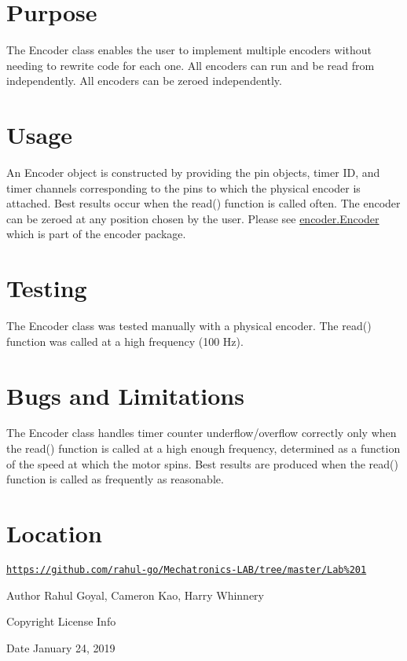 \hypertarget{index_purpose}{}\section{Purpose}\label{index_purpose}
The Encoder class enables the user to implement multiple encoders without needing to rewrite code for each one. All encoders can run and be read from independently. All encoders can be zeroed independently.\hypertarget{index_usage}{}\section{Usage}\label{index_usage}
An Encoder object is constructed by providing the pin objects, timer ID, and timer channels corresponding to the pins to which the physical encoder is attached. Best results occur when the read() function is called often. The encoder can be zeroed at any position chosen by the user. Please see \mbox{\hyperlink{classencoder_1_1_encoder}{encoder.\+Encoder}} which is part of the encoder package.\hypertarget{index_testing}{}\section{Testing}\label{index_testing}
The Encoder class was tested manually with a physical encoder. The read() function was called at a high frequency (100 Hz).\hypertarget{index_bugs_and_limitations}{}\section{Bugs and Limitations}\label{index_bugs_and_limitations}
The Encoder class handles timer counter underflow/overflow correctly only when the read() function is called at a high enough frequency, determined as a function of the speed at which the motor spins. Best results are produced when the read() function is called as frequently as reasonable.\hypertarget{index_location}{}\section{Location}\label{index_location}
\href{https://github.com/rahul-go/Mechatronics-LAB/tree/master/Lab%201}{\tt https\+://github.\+com/rahul-\/go/\+Mechatronics-\/\+L\+A\+B/tree/master/\+Lab\%201}

\begin{DoxyAuthor}{Author}
Rahul Goyal, Cameron Kao, Harry Whinnery
\end{DoxyAuthor}
\begin{DoxyCopyright}{Copyright}
License Info
\end{DoxyCopyright}
\begin{DoxyDate}{Date}
January 24, 2019 
\end{DoxyDate}
